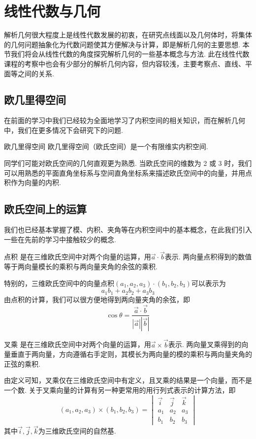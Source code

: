 \chapter{线性代数与几何}

解析几何很大程度上是线性代数发展的初衷，在研究点线面以及几何体时，将集体的几何问题抽象化为代数问题使其方便解决与计算，即是解析几何的主要思想. 本节我们将会从线性代数的角度探究解析几何的一些基本概念与方法. 此在线性代数课程的考察中也会有少部分的解析几何内容，但内容较浅，主要考察点、直线、平面等之间的关系.

\section{欧几里得空间}

在前面的学习中我们已经较为全面地学习了内积空间的相关知识，而在解析几何中，我们在更多情况下会研究下的问题.
\begin{definition}{欧几里得空间}{}
    欧几里得空间（欧氏空间）是一个有限维实内积空间.
\end{definition}
同学们可能对欧氏空间的几何直观更为熟悉. 当欧氏空间的维数为 2 或 3 时，我们可以用熟悉的平面直角坐标系与空间直角坐标系来描述欧氏空间中的向量，并用点积作为向量的内积.

\section{欧氏空间上的运算}

我们也已经基本掌握了模、内积、夹角等在内积空间中的基本概念，在此我们引入一些在先前的学习中接触较少的概念.
\begin{definition}{点积}{} 
    是在三维欧氏空间中对两个向量的运算，用$\vec{a}\cdot\vec{b}$表示. 两向量点积得到的数值等于两向量模长的乘积与两向量夹角的余弦的乘积.
\end{definition}
特别的，三维欧氏空间中的向量点积$(a_1,a_2,a_3)\cdot(b_1,b_2,b_3)$可以表示为\[a_1b_1+a_2b_2+a_3b_3\]
由点积的计算，我们可以很方便地得到两向量夹角的余弦，即\[\cos\theta=\frac{\vec{a}\cdot\vec{b}}{|\vec{a}||\vec{b}|}\]
\begin{definition}{叉乘}{} 
    是在三维欧氏空间中对两个向量的运算，用$\vec{a}\times\vec{b}$表示. 两向量叉乘得到的向量垂直于两向量，方向遵循右手定则，其模长为两向量的模的乘积与两向量夹角的正弦的乘积.
\end{definition}
由定义可知，叉乘仅在三维欧氏空间中有定义，且叉乘的结果是一个向量，而不是一个数. 关于叉乘向量的计算有另一种更常用的用行列式表示的计算方法，即
\[(a_1,a_2,a_3)\times(b_1,b_2,b_3)=\begin{vmatrix}
        \vec{i} & \vec{j} & \vec{k} \\
        a_1     & a_2     & a_3     \\
        b_1     & b_2     & b_3
    \end{vmatrix}\]
其中$\vec{i},\vec{j},\vec{k}$为三维欧氏空间的自然基.

